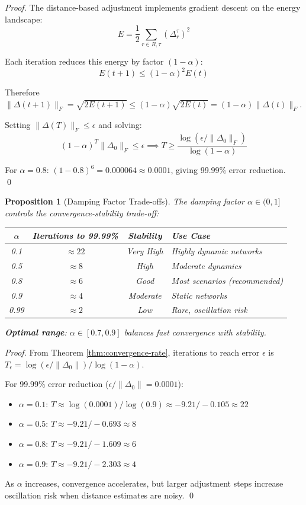 \documentclass[11pt]{article}
\newtheorem{proposition}{Proposition}
\begin{document}
\begin{proof}
The distance-based adjustment implements gradient descent on the energy landscape:
\[
E = \frac{1}{2} \sum_{r \in R, \tau} (\Delta_r^\tau)^2
\]

Each iteration reduces this energy by factor $(1-\alpha)$:
\[
E(t+1) \leq (1-\alpha)^2 E(t)
\]

Therefore $\|\Delta(t+1)\|_F = \sqrt{2E(t+1)} \leq (1-\alpha) \sqrt{2E(t)} = (1-\alpha) \|\Delta(t)\|_F$.

Setting $\|\Delta(T)\|_F \leq \epsilon$ and solving:
\[
(1-\alpha)^T \|\Delta_0\|_F \leq \epsilon \implies T \geq \frac{\log(\epsilon / \|\Delta_0\|_F)}{\log(1-\alpha)}
\]

For $\alpha = 0.8$: $(1-0.8)^6 = 0.000064 \approx 0.0001$, giving 99.99\% error reduction. \qed
\end{proof}

\begin{proposition}[Damping Factor Trade-offs]
\label{prop:damping-tradeoffs}
The damping factor $\alpha \in (0,1]$ controls the convergence-stability trade-off:

\begin{center}
\begin{tabular}{|c|c|c|l|}
\hline
\textbf{$\alpha$} & \textbf{Iterations to 99.99\%} & \textbf{Stability} & \textbf{Use Case} \\
\hline
0.1 & $\approx 22$ & Very High & Highly dynamic networks \\
0.5 & $\approx 8$ & High & Moderate dynamics \\
0.8 & $\approx 6$ & Good & Most scenarios (recommended) \\
0.9 & $\approx 4$ & Moderate & Static networks \\
0.99 & $\approx 2$ & Low & Rare, oscillation risk \\
\hline
\end{tabular}
\end{center}

\textbf{Optimal range}: $\alpha \in [0.7, 0.9]$ balances fast convergence with stability.
\end{proposition}

\begin{proof}
From Theorem \ref{thm:convergence-rate}, iterations to reach error $\epsilon$ is $T_\epsilon = \log(\epsilon / \|\Delta_0\|) / \log(1-\alpha)$.

For 99.99\% error reduction ($\epsilon / \|\Delta_0\| = 0.0001$):
\begin{itemize}
\item $\alpha = 0.1$: $T \approx \log(0.0001) / \log(0.9) \approx -9.21 / -0.105 \approx 22$
\item $\alpha = 0.5$: $T \approx -9.21 / -0.693 \approx 8$
\item $\alpha = 0.8$: $T \approx -9.21 / -1.609 \approx 6$
\item $\alpha = 0.9$: $T \approx -9.21 / -2.303 \approx 4$
\end{itemize}

As $\alpha$ increases, convergence accelerates, but larger adjustment steps increase oscillation risk when distance estimates are noisy. \qed
\end{proof}
\end{document}
